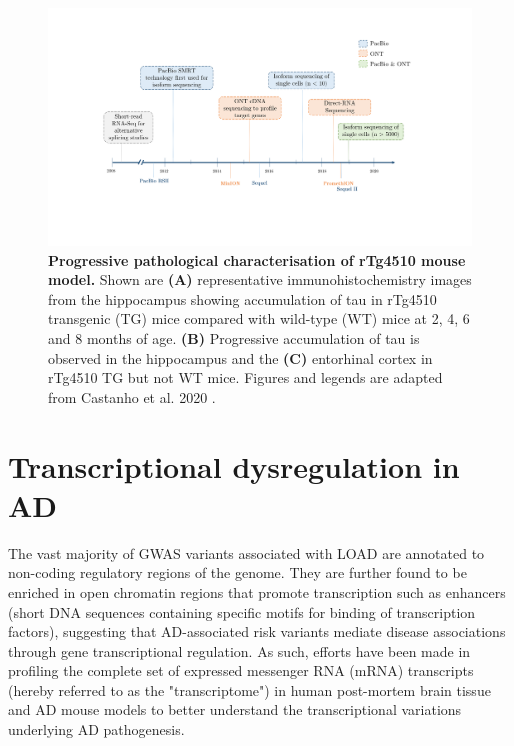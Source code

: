 \begin{landscape}
	\begin{figure}[htp]
		\centering
		\vspace{20pt}
		\includegraphics[page=3,trim={0 7cm 0 0 },clip, scale = 0.7]{Figures/Introduction_Figures_Landscape.pdf}
		\captionsetup{width=1.5\textwidth}
		\caption[Progressive pathological characterisation of rTg4510 mouse model]%
		{\textbf{Progressive pathological characterisation of rTg4510 mouse model.} Shown are \textbf{(A)} representative immunohistochemistry images from the hippocampus showing accumulation of tau in rTg4510 transgenic (TG) mice compared with wild-type (WT) mice at 2, 4, 6 and 8 months of age. \textbf{(B)} Progressive accumulation of tau is observed in the hippocampus and the \textbf{(C)} entorhinal cortex in rTg4510 TG but not WT mice. Figures and legends are adapted from Castanho et al. 2020 \cite{Castanho2020}.}
		\label{fig:immunohistochemistry}
	\end{figure}	
\end{landscape}

\clearpage
\section{Transcriptional dysregulation in AD}

The vast majority of GWAS variants associated with LOAD are annotated to non-coding regulatory regions of the genome\cite{Kunkle2019,Lambert2013}. They are further found to be enriched in open chromatin regions that promote transcription such as enhancers\cite{Kikuchi2019} (short DNA sequences containing specific motifs for binding of transcription factors), suggesting that AD-associated risk variants mediate disease associations through gene transcriptional regulation. As such, efforts have been made in profiling the complete set of expressed messenger RNA (mRNA) transcripts (hereby referred to as the "transcriptome") in human post-mortem brain tissue and AD mouse models to better understand the transcriptional variations underlying AD pathogenesis. 

